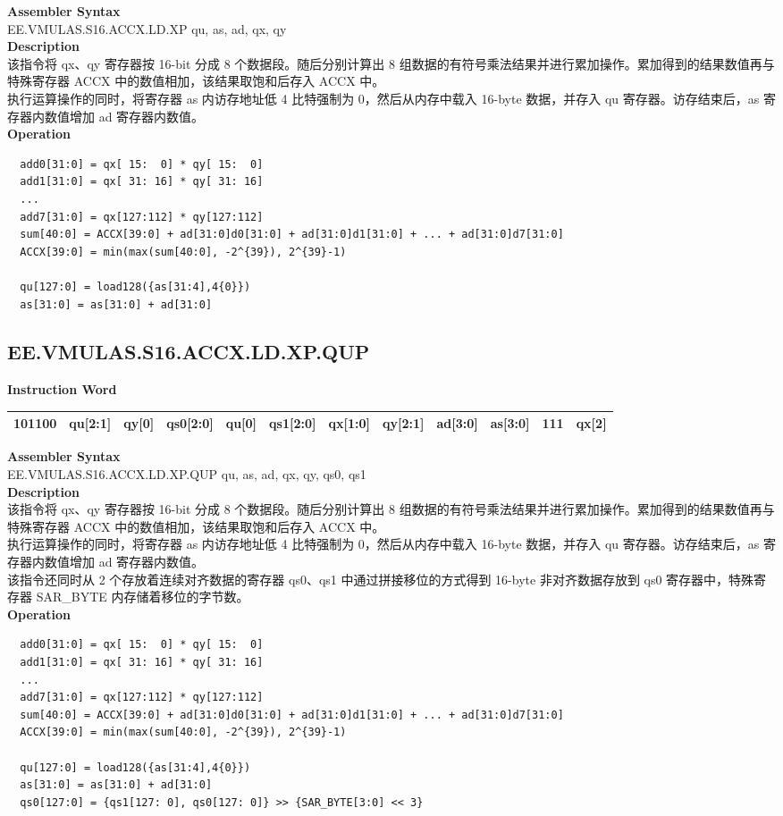 \textbf{Assembler Syntax} \\
EE.VMULAS.S16.ACCX.LD.XP qu, as, ad, qx, qy \\
\textbf{Description} \\
该指令将 qx、qy 寄存器按 16-bit 分成 8 个数据段。随后分别计算出 8 组数据的有符号乘法结果并进行累加操作。累加得到的结果数值再与特殊寄存器 ACCX 中的数值相加，该结果取饱和后存入 ACCX 中。\\
执行运算操作的同时，将寄存器 as 内访存地址低 4 比特强制为 0，然后从内存中载入 16-byte 数据，并存入 qu 寄存器。访存结束后，as 寄存器内数值增加 ad 寄存器内数值。\\
\textbf{Operation}
\begin{lstlisting}
  add0[31:0] = qx[ 15:  0] * qy[ 15:  0]
  add1[31:0] = qx[ 31: 16] * qy[ 31: 16]
  ...
  add7[31:0] = qx[127:112] * qy[127:112]
  sum[40:0] = ACCX[39:0] + ad[31:0]d0[31:0] + ad[31:0]d1[31:0] + ... + ad[31:0]d7[31:0]
  ACCX[39:0] = min(max(sum[40:0], -2^{39}), 2^{39}-1)

  qu[127:0] = load128({as[31:4],4{0}})
  as[31:0] = as[31:0] + ad[31:0]
\end{lstlisting}

\clearpage
\subsection{EE.VMULAS.S16.ACCX.LD.XP.QUP}\label{instruction:EEVMULASS16ACCXLDXPQUP}
\setlength\tabcolsep{6pt}
\textbf{Instruction Word} \\
\begin{tabular}{|c|c|c|c|c|c|c|c|c|c|c|c|}
	\hline
	101100 & qu[2:1] & qy[0] & qs0[2:0] & qu[0] & qs1[2:0] & qx[1:0] & qy[2:1] & ad[3:0] & as[3:0] & 111 & qx[2] \\
	\hline
\end{tabular}

\textbf{Assembler Syntax} \\
EE.VMULAS.S16.ACCX.LD.XP.QUP qu, as, ad, qx, qy, qs0, qs1 \\
\textbf{Description} \\
该指令将 qx、qy 寄存器按 16-bit 分成 8 个数据段。随后分别计算出 8 组数据的有符号乘法结果并进行累加操作。累加得到的结果数值再与特殊寄存器 ACCX 中的数值相加，该结果取饱和后存入 ACCX 中。\\
执行运算操作的同时，将寄存器 as 内访存地址低 4 比特强制为 0，然后从内存中载入 16-byte 数据，并存入 qu 寄存器。访存结束后，as 寄存器内数值增加 ad 寄存器内数值。\\
该指令还同时从 2 个存放着连续对齐数据的寄存器 qs0、qs1 中通过拼接移位的方式得到 16-byte 非对齐数据存放到 qs0 寄存器中，特殊寄存器 SAR\_BYTE 内存储着移位的字节数。\\
\textbf{Operation}
\begin{lstlisting}
  add0[31:0] = qx[ 15:  0] * qy[ 15:  0]
  add1[31:0] = qx[ 31: 16] * qy[ 31: 16]
  ...
  add7[31:0] = qx[127:112] * qy[127:112]
  sum[40:0] = ACCX[39:0] + ad[31:0]d0[31:0] + ad[31:0]d1[31:0] + ... + ad[31:0]d7[31:0]
  ACCX[39:0] = min(max(sum[40:0], -2^{39}), 2^{39}-1)

  qu[127:0] = load128({as[31:4],4{0}})
  as[31:0] = as[31:0] + ad[31:0]
  qs0[127:0] = {qs1[127: 0], qs0[127: 0]} >> {SAR_BYTE[3:0] << 3}
\end{lstlisting}

